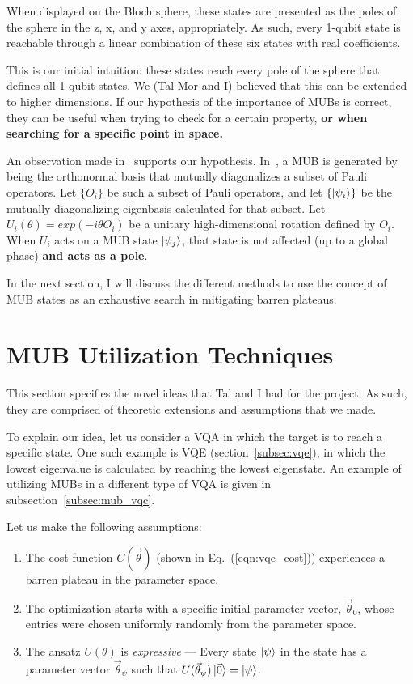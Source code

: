 \documentclass[a4paper,12pt]{article}
\newcommand{\thetas}{\vec{\theta}}
\begin{document}
When displayed on the Bloch sphere, these states are presented as the poles of the sphere in the z, x, and y axes, appropriately. As such, every 1-qubit state is reachable through a linear combination of these six states with real coefficients.

This is our initial intuition: these states reach every pole of the sphere that defines all 1-qubit states.
We (Tal Mor and I) believed that this can be extended to higher dimensions. If our hypothesis of the importance of MUBs is correct, they can be useful when trying to check for a certain property, \textbf{or when searching for a specific point in space.}

An observation made in~\cite{lawrence_mutually_2002} supports our hypothesis.
In~\cite{lawrence_mutually_2002}, a MUB is generated by being the orthonormal basis that mutually diagonalizes a subset of Pauli operators.
Let $\{O_i\}$ be such a subset of Pauli operators, and let $\{\ket{\psi_i}\}$ be the mutually diagonalizing eigenbasis calculated for that subset.
Let $U_i(\theta) = exp(-i\theta O_i)$ be a unitary high-dimensional rotation defined by $O_i$.
When $U_i$ acts on a MUB state $\ket{\psi_j}$, that state is not affected (up to a global phase) \textbf{and acts as a pole}.

In the next section, I will discuss the different methods to use the concept of MUB states as an exhaustive search in mitigating barren plateaus.


\section{MUB Utilization Techniques} \label{sec:mub_use}
This section specifies the novel ideas that Tal and I had for the project. As such, they are comprised of theoretic extensions and assumptions that we made.

To explain our idea, let us consider a VQA in which the target is to reach a specific state.
One such example is VQE (section~\ref{subsec:vqe}), in which the lowest eigenvalue is calculated by reaching the lowest eigenstate.
An example of utilizing MUBs in a different type of VQA is given in subsection~\ref{subsec:mub_vqc}.

Let us make the following assumptions:
\begin{enumerate}
    \item The cost function $C(\thetas)$ (shown in Eq.~(\ref{eqn:vqe_cost})) experiences a barren plateau in the parameter space. 
    \item The optimization starts with a specific initial parameter vector, $\thetas_0$, whose entries were chosen uniformly randomly from the parameter space.
    \item The ansatz $U(\theta)$ is \emph{expressive} --- Every state $\ket{\psi}$ in the state has a parameter vector $\thetas_\psi$ such that $U(\thetas_\psi)\ket{\vec{0}} = \ket{\psi}$.
    \label{itm:expressive}
\end{enumerate}
\end{document}
